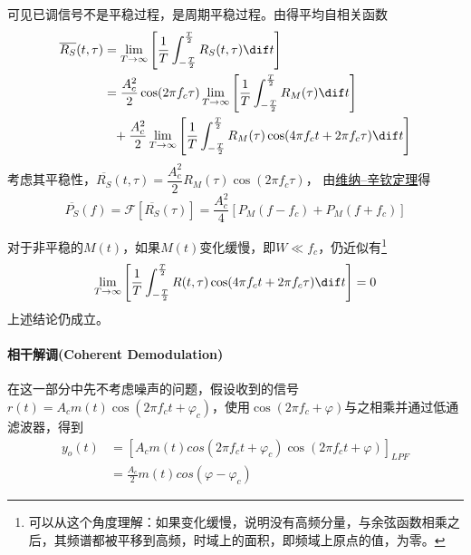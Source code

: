     可见已调信号不是平稳过程，是周期平稳过程。由得平均自相关函数
    \begin{equation}
        \begin{split}
            \overline{R_S}(t,\tau)&=\lim_{T\to\infty}\left[\frac{1}{T}\int_{-\frac{T}{2}}^{\frac{T}{2}}R_S(t,\tau)\dif t\right]\\
                                  &=\frac{A_c^2}{2}\cos(2\pi f_c \tau)\lim_{T\to\infty}\left[\frac{1}{T}\int_{-\frac{T}{2}}^{\frac{T}{2}}R_M(\tau)\dif t\right]\\
                                  &\phantom{=}+\frac{A_c^2}{2}\lim_{T\to\infty}\left[\frac{1}{T}\int_{-\frac{T}{2}}^{\frac{T}{2}}R_M(\tau)\cos(4\pi f_c t+2\pi f_c \tau)\dif t\right]
        \end{split}
    \end{equation}
    考虑其平稳性，$\overline{R_S}(t,\tau)=\dfrac{A_c^2}{2}R_M(\tau)\cos(2\pi f_c \tau)$，
    由\hyperref[thm:Wiener_Khinchin]{维纳--辛钦定理}得
    \begin{equation}\label{eq:DSB-SCAM-P}
            \overline{P_S}(f)=\mathscr{F}[\overline{R_S}(\tau)]=\frac{A_c^2}{4}[P_M(f-f_c)+P_M(f+f_c)]                        
    \end{equation}
    
    对于非平稳的$M(t)$，如果$M(t)$变化缓慢，即$W\ll f_c$，仍近似有\footnote{可以从这个角度理解：如果变化缓慢，说明没有高频分量，与余弦函数相乘之后，其频谱都被平移到高频，时域上的面积，即频域上原点的值，为零。}
    \begin{equation}
        \lim_{T\to\infty}\left[\frac{1}{T}\int_{-\frac{T}{2}}^{\frac{T}{2}}R(t,\tau)\cos(4\pi f_c t+2\pi f_c \tau)\dif t\right]=0
    \end{equation}
    上述结论仍成立。

    \paragraph{相干解调(Coherent Demodulation)}\mbox{}

    在这一部分中先不考虑噪声的问题，假设收到的信号$r(t)=A_cm(t)\cos(2\pi f_ct +\varphi_c)$，使用$\cos(2\pi f_c +\varphi)$与之相乘并通过低通滤波器，得到
    \begin{equation}
        \begin{split}
            y_o(t)&=[A_cm(t)cos(2\pi f_ct +\varphi_c)\cos(2\pi f_ct +\varphi)]_{LPF}\\%
                  &=\frac{A_c}{2}m(t)cos(\varphi-\varphi_c)
        \end{split}
    \end{equation}

